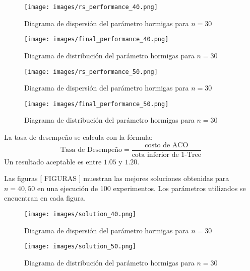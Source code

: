 \documentclass[conference]{IEEEtran}
\begin{document}
    \begin{figure}[htbp]
      \centering
      \begin{minipage}[t]{0.45\linewidth}
        \centering
        \texttt{[image: images/rs\_performance\_40.png]}
        \caption{Diagrama de dispersión del parámetro hormigas para $n=30$}
        \label{fig:image29}
      \end{minipage}
      \hfill
      \begin{minipage}[t]{0.45\linewidth}
        \centering
        \texttt{[image: images/final\_performance\_40.png]}
        \caption{Diagrama de distribución del parámetro hormigas para $n=30$}
        \label{fig:image30}
      \end{minipage}
      \begin{minipage}[t]{0.45\linewidth}
        \centering
        \texttt{[image: images/rs\_performance\_50.png]}
        \caption{Diagrama de dispersión del parámetro hormigas para $n=30$}
        \label{fig:image29}
      \end{minipage}
      \hfill
      \begin{minipage}[t]{0.45\linewidth}
        \centering
        \texttt{[image: images/final\_performance\_50.png]}
        \caption{Diagrama de distribución del parámetro hormigas para $n=30$}
        \label{fig:image30}
      \end{minipage}
    \end{figure}

La tasa de desempeño se calcula con la fórmula:
\begin{equation}
    \text{Tasa de Desempeño} = \frac{\text{costo de ACO}}{\text{cota inferior de 1-Tree}}
\end{equation}
Un resultado aceptable es entre $1.05$ y $1.20$.

Las figuras [ FIGURAS ] muestran las mejores soluciones obtenidas para $n=40, 50$ en una ejecución de 100 experimentos. Los parámetros utilizados se encuentran en cada figura.

    \begin{figure}[htbp]
      \centering
      \begin{minipage}[t]{0.45\linewidth}
        \centering
        \texttt{[image: images/solution\_40.png]}
        \caption{Diagrama de dispersión del parámetro hormigas para $n=30$}
        \label{fig:image29}
      \end{minipage}
      \hfill
      \begin{minipage}[t]{0.45\linewidth}
        \centering
        \texttt{[image: images/solution\_50.png]}
        \caption{Diagrama de distribución del parámetro hormigas para $n=30$}
        \label{fig:image30}
      \end{minipage}
    \end{figure}
\end{document}
